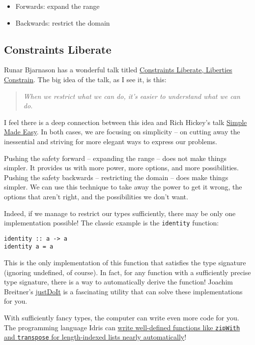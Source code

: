 \begin{itemize}
\item Forwards: expand the range
\item Backwards: restrict the domain
\end{itemize}




\subsection{Constraints Liberate}



Runar Bjarnason has a wonderful talk titled \href{https://www.youtube.com/watch?v=GqmsQeSzMdw}{Constraints Liberate, Liberties Constrain}. The big idea of the talk, as I see it, is this:
\begin{quotation}
\textit{When we restrict what we can do, it's easier to understand what we can do.}
\end{quotation}
I feel there is a deep connection between this idea and Rich Hickey's talk \href{https://www.youtube.com/watch?v=34_L7t7fD_U}{Simple Made Easy}. In both cases, we are focusing on simplicity -- on cutting away the inessential and striving for more elegant ways to express our problems.

Pushing the safety forward -- expanding the range -- does not make things simpler. It provides us with more power, more options, and more possibilities. Pushing the safety backwards -- restricting the domain -- does make things simpler. We can use this technique to take away the power to get it wrong, the options that aren't right, and the possibilities we don't want.

Indeed, if we manage to restrict our types sufficiently, there may be only one implementation possible! The classic example is the \texttt{identity} function:

\begin{verbatim}
identity :: a -> a
identity a = a
\end{verbatim}
This is the only implementation of this function that satisfies the type signature (ignoring undefined, of course). In fact, for any function with a sufficiently precise type signature, there is a way to automatically derive the function! Joachim Breitner's \href{https://www.joachim-breitner.de/blog/735-The_magic_%E2%80%9CJust_do_it%E2%80%9D_type_class}{justDoIt} is a fascinating utility that can solve these implementations for you.

With sufficiently fancy types, the computer can write even more code for you. The programming language Idris can \href{https://youtu.be/X36ye-1x_HQ?t=1140}{write well-defined functions like \texttt{zipWith} and \texttt{transpose} for length-indexed lists nearly automatically}!


